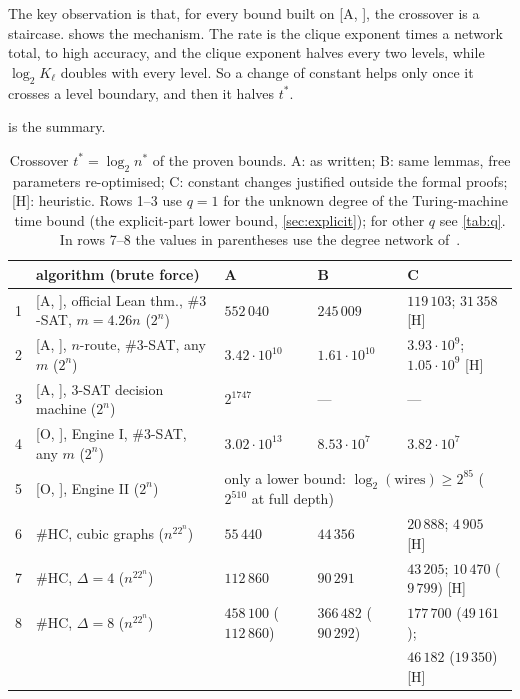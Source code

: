 \documentclass[10pt]{amsart}
\theoremstyle{definition}
\theoremstyle{remark}
\numberwithin{equation}{section}
\newcommand{\A}[1][]{\textup{[A\if\relax\detokenize{#1}\relax\else, #1\fi]}}
\newcommand{\Oa}[1][]{\textup{[O\if\relax\detokenize{#1}\relax\else, #1\fi]}}
\newcommand{\HC}{\#\mathrm{HC}}
\newcommand{\tst}{t^{*}}
\newcommand{\nst}{n^{*}}
\newcommand{\Hh}{\textup{[H]}}
\begin{document}
The key observation is that, for every bound built on \A, the crossover is a staircase.
 shows the mechanism. The rate is the clique exponent times a network total, to
high accuracy, and the clique exponent halves every two levels, while $\log_2K_\ell$ doubles with
every level. So a change of constant helps only once it crosses a level boundary, and then it halves
$\tst$.

 is the summary.

\begin{table}[ht]
\centering\footnotesize
\caption{Crossover $\tst=\log_2\nst$ of the proven bounds. A: as written; B: same lemmas, free
parameters re-optimised; C: constant changes justified outside the formal proofs; \Hh: heuristic.
Rows 1--3 use $q=1$ for the unknown degree of the Turing-machine time bound (the explicit-part
lower bound, \cref{sec:explicit}); for other $q$ see \cref{tab:q}. In rows 7--8 the values in
parentheses use the degree network of~\cite{TulsyanRepo26}.}\label{tab:headline}
\begin{tabular}{@{}lllll@{}}
\toprule
& algorithm (brute force) & A & B & C \\
\midrule
1 & \A, official Lean thm., $\#3$-SAT, $m=4.26n$ ($2^n$) & $552\,040$ & $245\,009$ & $119\,103$; $31\,358$ \Hh\\
2 & \A, $n$-route, $\#3$-SAT, any $m$ ($2^n$) & $3.42\cdot10^{10}$ & $1.61\cdot10^{10}$ & $3.93\cdot10^{9}$; $1.05\cdot10^{9}$ \Hh\\
3 & \A, $3$-SAT decision machine ($2^n$) & $2^{1747}$ & --- & ---\\
4 & \Oa, Engine I, $\#3$-SAT, any $m$ ($2^n$) & $3.02\cdot10^{13}$ & $8.53\cdot10^{7}$ & $3.82\cdot10^{7}$\\
5 & \Oa, Engine II ($2^n$) & \multicolumn{3}{l}{only a lower bound: $\log_2(\text{wires})\ge2^{85}$ ($2^{510}$ at full depth)}\\
6 & $\HC$, cubic graphs ($n^22^n$) & $55\,440$ & $44\,356$ & $20\,888$; $4\,905$ \Hh\\
7 & $\HC$, $\Delta=4$ ($n^22^n$) & $112\,860$ & $90\,291$ & $43\,205$; $10\,470$ ($9\,799$) \Hh\\
8 & $\HC$, $\Delta=8$ ($n^22^n$) & $458\,100$ ($112\,860$) & $366\,482$ ($90\,292$) & $177\,700$ ($49\,161$);\\
&&&& $46\,182$ ($19\,350$) \Hh\\
\bottomrule
\end{tabular}
\end{table}
\end{document}
